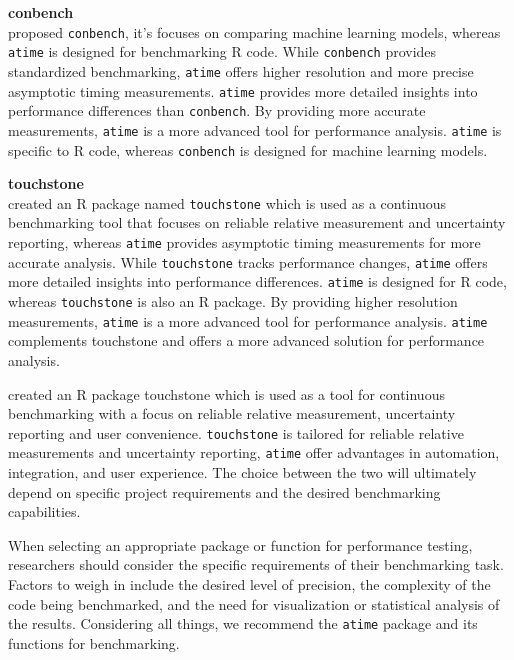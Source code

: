 \textbf{conbench} \\
\citet{conbench} proposed \texttt{conbench}, it's focuses on comparing machine learning models, whereas \texttt{atime} is designed for benchmarking R code. While \texttt{conbench} provides standardized benchmarking, \texttt{atime} offers higher resolution and more precise asymptotic timing measurements. \texttt{atime} provides more detailed insights into performance differences than \texttt{conbench}. By providing more accurate measurements, \texttt{atime} is a more advanced tool for performance analysis. \texttt{atime} is specific to R code, whereas \texttt{conbench} is designed for machine learning models.
\vspace{0.1in}

\textbf{touchstone} \\
\citet{touchstone} created an R package named \texttt{touchstone} which is used as a continuous benchmarking tool that focuses on reliable relative measurement and uncertainty reporting, whereas \texttt{atime} provides asymptotic timing measurements for more accurate analysis. While \texttt{touchstone} tracks performance changes, \texttt{atime} offers more detailed insights into performance differences. \texttt{atime} is designed for R code, whereas \texttt{touchstone} is also an R package. By providing higher resolution measurements, \texttt{atime} is a more advanced tool for performance analysis. \texttt{atime} complements touchstone and offers a more advanced solution for performance analysis.



\citet{touchstone} created an R package touchstone which is used as a tool for continuous benchmarking with a focus on reliable relative measurement, uncertainty reporting and user convenience. \texttt{touchstone} is tailored for reliable relative measurements and uncertainty reporting, \texttt{atime} offer advantages in automation, integration, and user experience. The choice between the two will ultimately depend on specific project requirements and the desired benchmarking capabilities.

    

\noindent When selecting an appropriate package or function for performance testing, researchers should consider the specific requirements of their benchmarking task. Factors to weigh in include the desired level of precision, the complexity of the code being benchmarked, and the need for visualization or statistical analysis of the results. Considering all things, we recommend the \texttt{atime} package and its functions for benchmarking.

